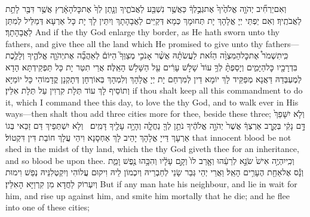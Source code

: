 {וְאִם\maqqaf יַרְחִ֞יב יְהֹוָ֤ה אֱלֹהֶ֙יךָ֙ אֶת\maqqaf גְּבֻ֣לְךָ֔ כַּאֲשֶׁ֥ר נִשְׁבַּ֖ע לַאֲבֹתֶ֑יךָ וְנָ֤תַן לְךָ֙ אֶת\maqqaf כׇּל\maqqaf הָאָ֔רֶץ אֲשֶׁ֥ר דִּבֶּ֖ר לָתֵ֥ת לַאֲבֹתֶֽיךָ׃}
{וְאִם יַפְתֵּי יְיָ אֱלָהָךְ יָת תְּחוּמָךְ כְּמָא דְּקַיֵּים לַאֲבָהָתָךְ וְיִתֵּין לָךְ יָת כָּל אַרְעָא דְּמַלֵּיל לְמִתַּן לַאֲבָהָתָךְ׃}
{And if the \lord\space thy God enlarge thy border, as He hath sworn unto thy fathers, and give thee all the land which He promised to give unto thy fathers—}{}
{כִּֽי\maqqaf תִשְׁמֹר֩ אֶת\maqqaf כׇּל\maqqaf הַמִּצְוָ֨ה הַזֹּ֜את לַעֲשֹׂתָ֗הּ אֲשֶׁ֨ר אָנֹכִ֣י מְצַוְּךָ֮ הַיּוֹם֒ לְאַהֲבָ֞ה אֶת\maqqaf יְהֹוָ֧ה אֱלֹהֶ֛יךָ וְלָלֶ֥כֶת בִּדְרָכָ֖יו כׇּל\maqqaf הַיָּמִ֑ים וְיָסַפְתָּ֨ לְךָ֥ עוֹד֙ שָׁלֹ֣שׁ עָרִ֔ים עַ֖ל הַשָּׁלֹ֥שׁ הָאֵֽלֶּה׃}
{אֲרֵי תִטַּר יָת כָּל תַּפְקֵידְתָּא הָדָא לְמֶעְבְּדַהּ דַּאֲנָא מְפַקֵּיד לָךְ יוֹמָא דֵין לְמִרְחַם יָת יְיָ אֱלָהָךְ וְלִמְהָךְ בְּאוֹרְחָן דְּתָקְנָן קֳדָמוֹהִי כָּל יוֹמַיָּא וְתוֹסֵיף לָךְ עוֹד תְּלָת קִרְוִין עַל תְּלָת אִלֵּין׃}
{if thou shalt keep all this commandment to do it, which I command thee this day, to love the \lord\space thy God, and to walk ever in His ways—then shalt thou add three cities more for thee, beside these three;}{}
{וְלֹ֤א יִשָּׁפֵךְ֙ דָּ֣ם נָקִ֔י בְּקֶ֣רֶב אַרְצְךָ֔ אֲשֶׁר֙ יְהֹוָ֣ה אֱלֹהֶ֔יךָ נֹתֵ֥ן לְךָ֖ נַחֲלָ֑ה וְהָיָ֥ה עָלֶ֖יךָ דָּמִֽים׃ \petucha }
{וְלָא יִשְׁתְּפֵיךְ דַּם זַכַּאי בְּגוֹ אַרְעָךְ דַּייָ אֱלָהָךְ יָהֵיב לָךְ אַחְסָנָא וִיהֵי עֲלָךְ חוֹבַת דִּין דִּקְטוֹל׃}
{that innocent blood be not shed in the midst of thy land, which the \lord\space thy God giveth thee for an inheritance, and so blood be upon thee.}{}
{וְכִֽי\maqqaf יִהְיֶ֥ה אִישׁ֙ שֹׂנֵ֣א לְרֵעֵ֔הוּ וְאָ֤רַב לוֹ֙ וְקָ֣ם עָלָ֔יו וְהִכָּ֥הוּ נֶ֖פֶשׁ וָמֵ֑ת וְנָ֕ס אֶל\maqqaf אַחַ֖ת הֶעָרִ֥ים הָאֵֽל׃}
{וַאֲרֵי יְהֵי גְּבַר שָׂנֵי לְחַבְרֵיהּ וְיִכְמוֹן לֵיהּ וִיקוּם עֲלוֹהִי וְיִקְטְלִנֵּיהּ נְפַשׁ וִימוּת וְיִעְרוֹק לַחֲדָא מִן קִרְוַיָּא הָאִלֵּין׃}
{But if any man hate his neighbour, and lie in wait for him, and rise up against him, and smite him mortally that he die; and he flee into one of these cities;}{}
